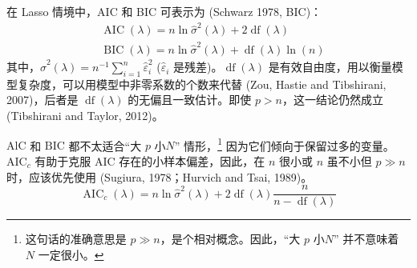 在 Lasso 情境中，AIC 和 BIC 可表示为 (Schwarz 1978, BIC)：
%
%
\begin{equation}\label{eq:lasso-aic}
\begin{aligned}
&\operatorname{AIC}(\lambda)=n \ln \widehat{\sigma}^{2}(\lambda)+2 \operatorname{df}(\lambda) \\
&\operatorname{BIC}(\lambda)=n \ln \widehat{\sigma}^{2}(\lambda)+\operatorname{df}(\lambda) \ln (n)
\end{aligned}
\end{equation}
%
其中，$\widehat{\sigma}^{2}(\lambda)=n^{-1} \sum_{i=1}^{n} \widehat{\varepsilon}_{i}^{2}$ ($\widehat{\varepsilon}_{i}$ 是残差)。$\operatorname{df}(\lambda)$ 是有效自由度，用以衡量模型复杂度，可以用模型中非零系数的个数来代替 (Zou, Hastie and Tibshirani, 2007)，后者是 $\operatorname{df}(\lambda)$ 的无偏且一致估计。即使 $p>n$，这一结论仍然成立 (Tibshirani and Taylor, 2012)。

$\mathrm{AlC}$ 和 $\mathrm{BIC}$ 都不太适合“大 $p$ 小$N$” 情形，\footnote{%
  这句话的准确意思是 $p \gg n$，是个相对概念。因此，“大 $p$ 小$N$” 并不意味着 $N$ 一定很小。}
因为它们倾向于保留过多的变量。$\mathrm{AIC}_{c}$ 有助于克服 $\mathrm{AIC}$ 存在的小样本偏差，因此，在 $n$ 很小或 $n$ 虽不小但 $p\gg n$ 时，应该优先使用 (Sugiura, 1978；Hurvich and Tsai, 1989)。
\begin{equation}\label{eq:lasso-aicc}
\operatorname{AIC}_{c}(\lambda)=n \ln \widehat{\sigma}^{2}(\lambda)+2 \operatorname{df}(\lambda) \frac{n}{n-\operatorname{df}(\lambda)}
\end{equation}

